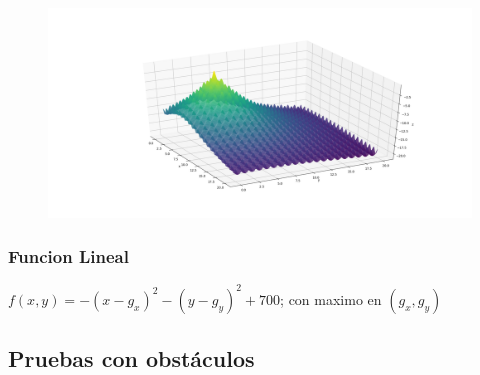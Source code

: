 \documentclass[runningheads]{llncs}
\begin{document}
    \begin{figure}
        \includegraphics[scale=0.5]{graficas_ackley}
        \centering
        \caption{}
        \label{fig:2}
    \end{figure}

    \subsubsection{Funcion Lineal}
    $f(x,y)=-(x-g_x)^2 - (y - g_y)^2 + 700$; con maximo en $(g_x,g_y)$

    \subsection{Pruebas con obstáculos}
\end{document}
